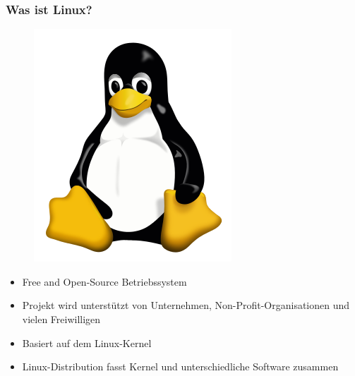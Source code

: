 \begin{frame}
\frametitle{Was ist Linux?}
\begin{figure}
\includegraphics[scale=0.17]{resources/tux.png}
\end{figure}
\begin{itemize}
	\item Free and Open-Source Betriebssystem
	\item Projekt wird unterstützt von Unternehmen, Non-Profit-Organisationen und vielen Freiwilligen
	\item Basiert auf dem Linux-Kernel
	\item Linux-Distribution fasst Kernel und unterschiedliche Software zusammen
\end{itemize}
\end{frame}

